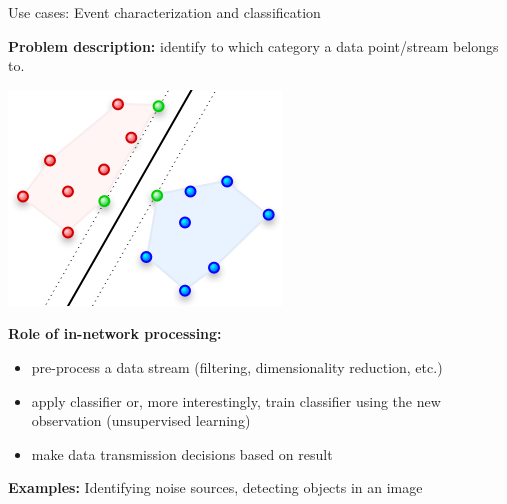 \documentclass{beamer}
\begin{document}
    \begin{frame}{Use cases: Event characterization and classification}
        \begin{minipage}{0.6\linewidth}
            {\bf Problem description:} identify to which category a data point/stream belongs to.
        \end{minipage}
        \begin{minipage}{0.35\linewidth}
            \begin{center}
                \includegraphics[scale=0.3]{figures/mj-01-svm.png}
            \end{center}
        \end{minipage}
        \vfill 
        {\bf Role of in-network processing:} 
        \begin{itemize}
            \item pre-process a data stream (filtering, dimensionality reduction, etc.)
            \item apply classifier or, more interestingly, train classifier using the new observation (unsupervised learning) 
            \item make data transmission decisions based on result
        \end{itemize}
        \vfill 
        {\bf Examples:} Identifying noise sources, detecting objects in an image 
    \end{frame}
    
\end{document}
